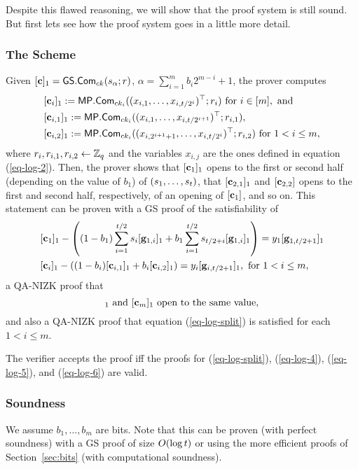Despite this flawed reasoning, we will show that the proof system is still sound. But first lets see how the proof system goes in a little more detail.

\subsubsection{The Scheme}
Given \([\mathbf{c}]_1={\mathsf{GS}}.\mathsf{Com}_{ck}(s_\alpha;r)\), \(\alpha=\sum_{i=1}^{m}b_i2^{m-i}+1\), the prover computes
\begin{align*}
&[\mathbf{c}_i]_1:=\mathsf{MP}.\mathsf{Com}_{ck_i}((x_{i,1},\ldots,x_{i,t /2^i})^\top;r_i) \text{ for } i \in[m], \text{ and}\\
&[\mathbf{c}_{i,1}]_1:=\mathsf{MP}.\mathsf{Com}_{ck_i}((x_{i,1},\ldots,x_{i,t /2^{i+1}})^\top;r_{i,1}),\\
&[\mathbf{c}_{i,2}]_1:=\mathsf{MP}.\mathsf{Com}_{ck_i}((x_{i,2^{i+1}+1},\ldots, x_{i,t /2^i})^\top;r_{i,2})\text{ for }1 < i \leq m,
\end{align*}
where \(r_i,r_{i,1},r_{i,2}\gets\mathbb{Z}_q\) and the variables \(x_{i,j}\) are the ones defined in equation (\ref{eq-log-2}). Then, the prover shows that
\([\mathbf{c}_1]_1\) opens to the first or second half (depending on the value of \(b_1\)) of \((s_1,\ldots,s_t )\), that \([\mathbf{c}_{2,1}]_1\) and \([\mathbf{c}_{2,2}]\) opens to the first and second half, respectively, of an opening of \([\mathbf{c}_{1}]\), and so on. This statement can be proven with a GS proof of
 the satisfiability of
\begin{align}
&[\mathbf{c}_1]_1-\left((1-b_1)\sum_{i=1}^{t /2}s_i[\mathbf{g}_{1,i}]_1 + b_1\sum_{i=1}^{t /2} s_{t /2+i}[\mathbf{g}_{1,i}]_1\right) = y_1[\mathbf{g}_{1,t /2+1}]_1 \label{eq-log-4}\\
&[\mathbf{c}_i]_1-\left((1-b_i)[\mathbf{c}_{i,1}]_1+b_i[\mathbf{c}_{i,2}]_1\right) = y_i[\mathbf{g}_{i,t /2+1}]_1, \text{ for } 1 < i \leq m,  \label{eq-log-5}
\end{align}
a QA-NIZK proof that
\begin{equation}
[\vecb{c}]_1\text{ and }[\vecb{c}_m]_1\text{ open to the same value}, \label{eq-log-6}
\end{equation}
and also a QA-NIZK proof that equation (\ref{eq-log-split}) is satisfied for each \(1<i\leq m\).

The verifier accepts the proof iff the proofs for (\ref{eq-log-split}), (\ref{eq-log-4}), (\ref{eq-log-5}), and (\ref{eq-log-6}) are valid.

\subsubsection{Soundness}
We assume \(b_1,\ldots,b_m\) are bits. Note that this can be proven (with perfect soundness) with a GS proof of size \(O(\log t )\) or using the more efficient proofs of Section~\ref{sec:bits} (with computational soundness).

